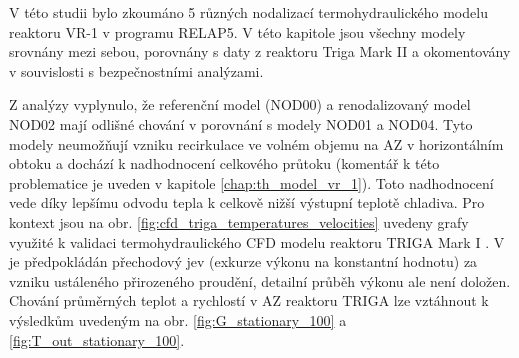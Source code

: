 V této studii bylo zkoumáno 5 různých nodalizací termohydraulického modelu reaktoru VR-1 v programu RELAP5. V této kapitole jsou všechny modely srovnány mezi sebou, porovnány s daty z reaktoru Triga Mark II a okomentovány v souvislosti s bezpečnostními analýzami.

Z analýzy vyplynulo, že referenční model (NOD00) a renodalizovaný model NOD02 mají odlišné chování v porovnání s modely NOD01 a NOD04. Tyto modely neumožňují vzniku recirkulace ve volném objemu na AZ v horizontálním obtoku a dochází k nadhodnocení celkového průtoku (komentář k této problematice je uveden v kapitole \ref{chap:th_model_vr_1}). Toto nadhodnocení vede díky lepšímu odvodu tepla k celkově nižší výstupní teplotě chladiva. Pro kontext  jsou na obr. \ref{fig:cfd_triga_temperatures_velocities} uvedeny grafy využité k validaci termohydraulického CFD modelu reaktoru TRIGA Mark I \cite{TRIGA_CFD}. V \cite{TRIGA_CFD} je předpokládán přechodový jev (exkurze výkonu na konstantní hodnotu) za vzniku ustáleného přirozeného proudění, detailní průběh výkonu ale není doložen. Chování průměrných teplot a rychlostí v AZ reaktoru TRIGA lze vztáhnout k výsledkům uvedeným na obr. \ref{fig:G_stationary_100} a \ref{fig:T_out_stationary_100}.



